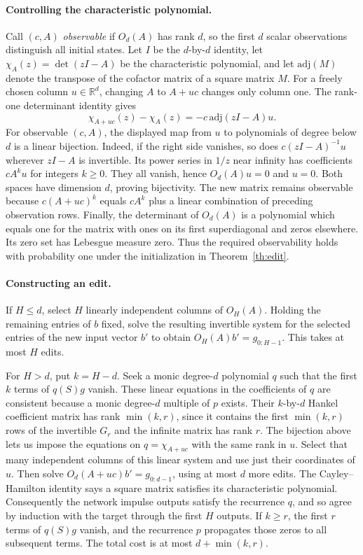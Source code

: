 \paragraph{Controlling the characteristic polynomial.}
Call \((c,A)\) \emph{observable} if \(O_d(A)\) has rank \(d\), so the first \(d\) scalar observations distinguish all initial states. Let \(I\) be the \(d\)-by-\(d\) identity, let \(\chi_A(z)=\det(zI-A)\) be the characteristic polynomial, and let \(\mathrm{adj}(M)\) denote the transpose of the cofactor matrix of a square matrix \(M\). For a freely chosen column \(u\in\mathbb R^d\), changing \(A\) to \(A+uc\) changes only column one. The rank-one determinant identity gives
\[
         \chi_{A+uc}(z)-\chi_A(z)=-c\,\mathrm{adj}(zI-A)u .
\]
For observable \((c,A)\), the displayed map from \(u\) to polynomials of degree below \(d\) is a linear bijection. Indeed, if the right side vanishes, so does \(c(zI-A)^{-1}u\) wherever \(zI-A\) is invertible. Its power series in \(1/z\) near infinity has coefficients \(cA^ku\) for integers \(k\ge0\). They all vanish, hence \(O_d(A)u=0\) and \(u=0\). Both spaces have dimension \(d\), proving bijectivity. The new matrix remains observable because \(c(A+uc)^k\) equals \(cA^k\) plus a linear combination of preceding observation rows. Finally, the determinant of \(O_d(A)\) is a polynomial which equals one for the matrix with ones on its first superdiagonal and zeros elsewhere. Its zero set has Lebesgue measure zero. Thus the required observability holds with probability one under the initialization in Theorem~\ref{th:edit}.

\paragraph{Constructing an edit.}
If \(H\le d\), select \(H\) linearly independent columns of \(O_H(A)\). Holding the remaining entries of \(b\) fixed, solve the resulting invertible system for the selected entries of the new input vector \(b'\) to obtain \(O_H(A)b'=g_{0:H-1}\). This takes at most \(H\) edits.

For \(H>d\), put \(k=H-d\). Seek a monic degree-\(d\) polynomial \(q\) such that the first \(k\) terms of \(q(S)g\) vanish. These linear equations in the coefficients of \(q\) are consistent because a monic degree-\(d\) multiple of \(p\) exists. Their \(k\)-by-\(d\) Hankel coefficient matrix has rank \(\min(k,r)\), since it contains the first \(\min(k,r)\) rows of the invertible \(G_r\) and the infinite matrix has rank \(r\). The bijection above lets us impose the equations on \(q=\chi_{A+uc}\) with the same rank in \(u\). Select that many independent columns of this linear system and use just their coordinates of \(u\). Then solve \(O_d(A+uc)b'=g_{0:d-1}\), using at most \(d\) more edits. The Cayley--Hamilton identity says a square matrix satisfies its characteristic polynomial. Consequently the network impulse outputs satisfy the recurrence \(q\), and so agree by induction with the target through the first \(H\) outputs. If \(k\ge r\), the first \(r\) terms of \(q(S)g\) vanish, and the recurrence \(p\) propagates those zeros to all subsequent terms. The total cost is at most \(d+\min(k,r)\).

